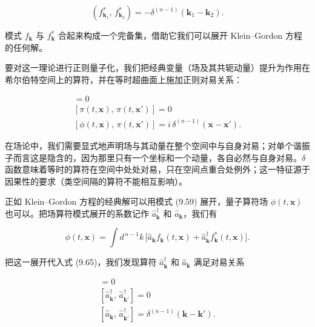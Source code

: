 
\begin{equation*}
(f^{*}_{\mathbf{k}_1},\, f^{*}_{\mathbf{k}_2}) = -\delta^{(n-1)}(\mathbf{k}_1-\mathbf{k}_2).
\tag{9.64}
\end{equation*}

模式 $f_{\mathbf{k}}$ 与 $f^{*}_{\mathbf{k}}$ 合起来构成一个完备集，借助它我们可以展开 Klein--Gordon 方程的任何解。

要对这一理论进行正则量子化，我们把经典变量（场及其共轭动量）提升为作用在希尔伯特空间上的算符，并在等时超曲面上施加正则对易关系：

\begin{gather*}
[\phi(t,\mathbf{x}),\, \phi(t,\mathbf{x}')] = 0 \\
[\pi(t,\mathbf{x}),\, \pi(t,\mathbf{x}')] = 0 \\
[\phi(t,\mathbf{x}),\, \pi(t,\mathbf{x}')] = i\,\delta^{(n-1)}(\mathbf{x}-\mathbf{x}').
\tag{9.65}
\end{gather*}

在场论中，我们需要显式地声明场与其动量在整个空间中与自身对易；对单个谐振子而言这是隐含的，因为那里只有一个坐标和一个动量，各自必然与自身对易。$\delta$ 函数意味着等时的算符在空间中处处对易，只在空间点重合处例外；这一特征源于因果性的要求（类空间隔的算符不能相互影响）。

正如 Klein--Gordon 方程的经典解可以用模式 (9.59) 展开，量子算符场 $\phi(t,\mathbf{x})$ 也可以。把场算符模式展开的系数记作 $\hat{a}^{\dagger}_{\mathbf{k}}$ 和 $\hat{a}_{\mathbf{k}}$，我们有

\begin{equation*}
\phi(t,\mathbf{x}) = \int d^{\,n-1}k\,\bigl[\hat{a}_{\mathbf{k}}f_{\mathbf{k}}(t,\mathbf{x}) + \hat{a}^{\dagger}_{\mathbf{k}}f^{*}_{\mathbf{k}}(t,\mathbf{x})\bigr].
\tag{9.66}
\end{equation*}

把这一展开代入式 (9.65)，我们发现算符 $\hat{a}^{\dagger}_{\mathbf{k}}$ 和 $\hat{a}_{\mathbf{k}}$ 满足对易关系

\begin{gather*}
[\hat{a}_{\mathbf{k}},\, \hat{a}_{\mathbf{k}'}] = 0 \\
[\hat{a}^{\dagger}_{\mathbf{k}},\, \hat{a}^{\dagger}_{\mathbf{k}'}] = 0 \\
[\hat{a}_{\mathbf{k}},\, \hat{a}^{\dagger}_{\mathbf{k}'}] = \delta^{(n-1)}(\mathbf{k}-\mathbf{k}').
\tag{9.67}
\end{gather*}

